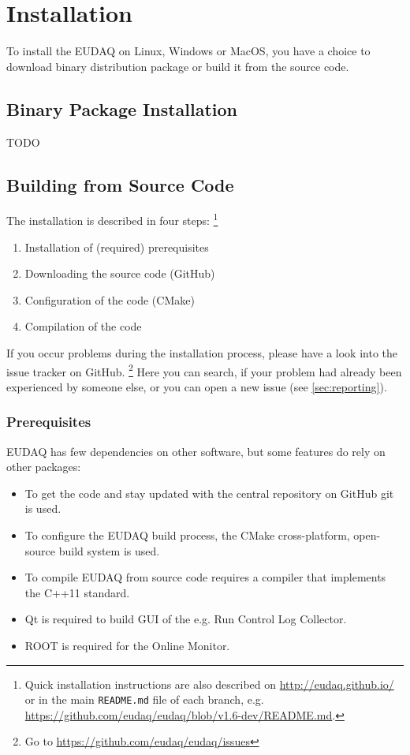 \section{Installation}
To install the EUDAQ on Linux, Windows or MacOS, you have a choice to download binary distribution package or build it from the source code.

\subsection{Binary Package Installation}
TODO


\subsection{Building from Source Code}

The installation is described in four steps:%
\footnote{Quick installation instructions are also described on \url{http://eudaq.github.io/} or in the main \texttt{README.md} file of each branch, e.g. \url{https://github.com/eudaq/eudaq/blob/v1.6-dev/README.md}.}
\begin{enumerate}
\item Installation of (required) prerequisites
\item Downloading the source code (GitHub)
\item Configuration of the code (CMake)
\item Compilation of the code
\end{enumerate}

If you occur problems during the installation process, please have a look into the issue tracker on GitHub.%
\footnote{Go to \url{https://github.com/eudaq/eudaq/issues}} 
Here you can search, if your problem had already been experienced by someone else, or you can open a new issue (see \autoref{sec:reporting}).

\subsubsection{Prerequisites}

EUDAQ has few dependencies on other software, but some features do rely on other packages:
\begin{itemize}
\item To get the code and stay updated with the central repository on GitHub git is used.
\item To configure the EUDAQ build process, the CMake cross-platform, open-source build system is used.
\item To compile EUDAQ from source code requires a compiler that implements the C++11 standard.
\item Qt is required to build GUI of the e.g. Run Control Log Collector. 
\item ROOT is required for the Online Monitor.
\end{itemize}


